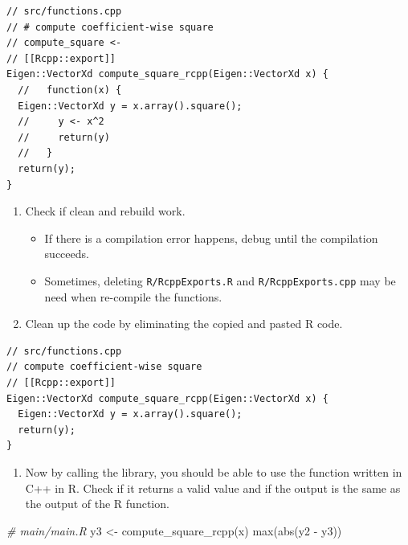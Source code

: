 \documentclass[
]{book}
\newenvironment{Shaded}{\begin{snugshade}}{\end{snugshade}}
\newcommand{\CommentTok}[1]{\textcolor[rgb]{0.56,0.35,0.01}{\textit{#1}}}
\newcommand{\FunctionTok}[1]{\textcolor[rgb]{0.00,0.00,0.00}{#1}}
\newcommand{\NormalTok}[1]{#1}
\newcommand{\OtherTok}[1]{\textcolor[rgb]{0.56,0.35,0.01}{#1}}
\newcommand{\SpecialCharTok}[1]{\textcolor[rgb]{0.00,0.00,0.00}{#1}}
\providecommand{\tightlist}{%
  \setlength{\itemsep}{0pt}\setlength{\parskip}{0pt}}
\begin{document}
\begin{verbatim}
// src/functions.cpp
// # compute coefficient-wise square
// compute_square <-
// [[Rcpp::export]]
Eigen::VectorXd compute_square_rcpp(Eigen::VectorXd x) {
  //   function(x) {
  Eigen::VectorXd y = x.array().square();
  //     y <- x^2
  //     return(y)
  //   }
  return(y);
}
\end{verbatim}

\begin{enumerate}
\def\labelenumi{\arabic{enumi}.}
\setcounter{enumi}{8}
\tightlist
\item
  Check if clean and rebuild work.

  \begin{itemize}
  \tightlist
  \item
    If there is a compilation error happens, debug until the compilation succeeds.
  \item
    Sometimes, deleting \texttt{R/RcppExports.R} and \texttt{R/RcppExports.cpp} may be need when re-compile the functions.
  \end{itemize}
\item
  Clean up the code by eliminating the copied and pasted R code.
\end{enumerate}

\begin{verbatim}
// src/functions.cpp
// compute coefficient-wise square
// [[Rcpp::export]]
Eigen::VectorXd compute_square_rcpp(Eigen::VectorXd x) {
  Eigen::VectorXd y = x.array().square();
  return(y);
}
\end{verbatim}

\begin{enumerate}
\def\labelenumi{\arabic{enumi}.}
\setcounter{enumi}{10}
\tightlist
\item
  Now by calling the library, you should be able to use the function written in C++ in R. Check if it returns a valid value and if the output is the same as the output of the R function.
\end{enumerate}

\begin{Shaded}
\begin{Highlighting}[]
\CommentTok{\# main/main.R}
\NormalTok{y3 }\OtherTok{\textless{}{-}} \FunctionTok{compute\_square\_rcpp}\NormalTok{(x)}
\FunctionTok{max}\NormalTok{(}\FunctionTok{abs}\NormalTok{(y2 }\SpecialCharTok{{-}}\NormalTok{ y3))}
\end{Highlighting}
\end{Shaded}
\end{document}

